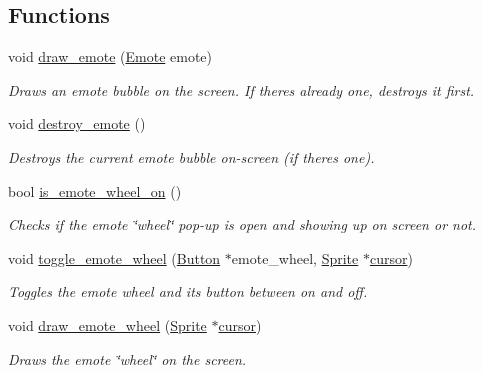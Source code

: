 \subsection*{Functions}
\begin{DoxyCompactItemize}
\item 
void \mbox{\hyperlink{group__emote_gaf6942466a79762f72a66284fc1d13ad3}{draw\+\_\+emote}} (\mbox{\hyperlink{group__emote_ga0e527855c554e31654c9beb340145574}{Emote}} emote)
\begin{DoxyCompactList}\small\item\em Draws an emote bubble on the screen. If there\textquotesingle{}s already one, destroys it first. \end{DoxyCompactList}\item 
void \mbox{\hyperlink{group__emote_ga955eff65036e00685619117d7bb9a228}{destroy\+\_\+emote}} ()
\begin{DoxyCompactList}\small\item\em Destroys the current emote bubble on-\/screen (if there\textquotesingle{}s one). \end{DoxyCompactList}\item 
bool \mbox{\hyperlink{group__emote_gac9359f9dfee500c297df48a9cdb2fb11}{is\+\_\+emote\+\_\+wheel\+\_\+on}} ()
\begin{DoxyCompactList}\small\item\em Checks if the emote \char`\"{}wheel\char`\"{} pop-\/up is open and showing up on screen or not. \end{DoxyCompactList}\item 
void \mbox{\hyperlink{group__emote_gab67bd820d159dbce1349586c05aeac11}{toggle\+\_\+emote\+\_\+wheel}} (\mbox{\hyperlink{struct_button}{Button}} $\ast$emote\+\_\+wheel, \mbox{\hyperlink{struct_sprite}{Sprite}} $\ast$\mbox{\hyperlink{pengoo_8c_a3a7ea4305773abf5347bb261a8a5c16b}{cursor}})
\begin{DoxyCompactList}\small\item\em Toggles the emote wheel and its button between on and off. \end{DoxyCompactList}\item 
void \mbox{\hyperlink{group__emote_gac2165e24eab22afc199808350c2ef84a}{draw\+\_\+emote\+\_\+wheel}} (\mbox{\hyperlink{struct_sprite}{Sprite}} $\ast$\mbox{\hyperlink{pengoo_8c_a3a7ea4305773abf5347bb261a8a5c16b}{cursor}})
\begin{DoxyCompactList}\small\item\em Draws the emote \char`\"{}wheel\char`\"{} on the screen. \end{DoxyCompactList}\item 

\end{DoxyCompactItemize}
